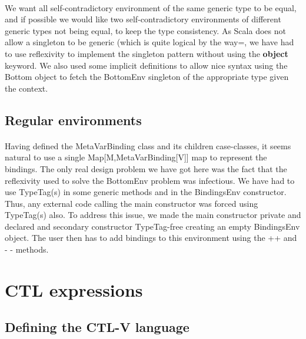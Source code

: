 \documentclass{report}
\begin{document}
\paragraph{}
\hspace{4mm}We want all self-contradictory environment of the same generic type to be equal, and if possible we would like two self-contradictory environments of
different generic types not being equal, to keep the type consistency. As Scala does not allow a singleton to be generic (which is quite logical by the way=,
we have had to use reflexivity to implement the singleton pattern without using the \textbf{object} keyword. We also used some implicit definitions to allow nice syntax using 
the Bottom object to fetch the BottomEnv singleton of the appropriate type given the context.

\subsection{Regular environments}

\paragraph{}
\hspace{4mm}Having defined the MetaVarBinding class and its children case-classes, it seems natural to use a single Map[M,MetaVarBinding[V]] map to
represent the bindings. The only real design problem we have got here was the fact that the reflexivity used to solve the BottomEnv problem
was infectious. We have had to use TypeTag(s) in some generic methods and in the BindingsEnv constructor. Thus, any external code
calling the main constructor was forced using TypeTag(s) also. To address this issue, we made the main constructor private and declared and secondary constructor
TypeTag-free creating an empty BindingsEnv object. The user then has to add bindings to this environment using the ++ and - - methods.

\section{CTL expressions}

\subsection{Defining the CTL-V language}
\end{document}
